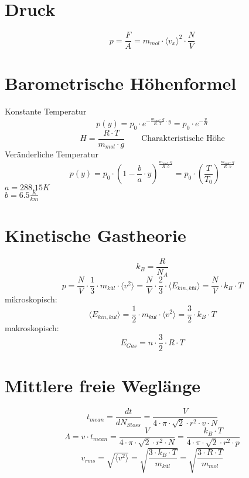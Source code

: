 \section{Druck}
\[ \boxed{p = \frac{F}{A} 
= m_{mol} \cdot {\langle v_x\rangle}^2 \cdot \frac{N}{V}} \]

\section{Barometrische Höhenformel}
Konstante Temperatur
\[ \boxed{p(y) 
= p_0 \cdot e^{- \frac{m_{mol} \cdot g}{R \cdot T} \cdot y} 
= p_0 \cdot e^{- \frac{y}{H}}}\]
\[ \boxed{H = \frac{R \cdot T}{m_{mol} \cdot g} 
\qquad \text{Charakteristische Höhe}} \]
Veränderliche Temperatur
\[ \boxed{p(y) = p_0 \cdot \left(1 - \frac{b}{a} \cdot y\right)^
{\frac{m_{mol} \cdot g}{R \cdot b}} 
= p_0 \cdot \left(\frac{T}{T_0}\right)^
{\frac{m_{mol} \cdot g}{R \cdot b}}} \]
$a = 288.15 K$ \\
$b = 6.5 \frac{K}{km}$ \\

\section{Kinetische Gastheorie}
\[ \boxed{k_B = \frac{R}{N_A}} \]
\[ \boxed{p = \frac{N}{V} \cdot \frac{1}{3} \cdot  m_{kül} \cdot \langle v^2\rangle  
= \frac{N}{V} \cdot \frac{2}{3} \cdot \langle E_{kin, kül}\rangle  
= \frac{N}{V} \cdot  k_B \cdot T} \]
mikroskopisch: 
\[ \boxed{\langle E_{kin, kül}\rangle  
= \frac{1}{2} \cdot m_{kül} \cdot  \langle v^2\rangle 
= \frac{3}{2} \cdot k_B \cdot T} \]
makroskopisch: 
\[ \boxed{E_{Gas} = n \cdot \frac{3}{2} \cdot R \cdot T} \]

\section{Mittlere freie Weglänge}
\[ \boxed{t_{mean} = \frac{d t}{d N_{Stoss}} 
= \frac{V}{4 \cdot \pi \cdot \sqrt{2} \cdot r^2 \cdot v \cdot N}} \]
\[ \boxed{\Lambda = v \cdot t_{mean} 
= \frac{V}{4 \cdot \pi \cdot \sqrt{2} \cdot r^2 \cdot N} 
= \frac{k_B \cdot T}{4 \cdot \pi \cdot \sqrt{2} \cdot r^2 \cdot p}} \]
\[ \boxed{v_{rms} = \sqrt{\langle v^2\rangle} 
= \sqrt{\frac{3 \cdot k_B \cdot T}{m_{kül}}} 
= \sqrt{\frac{3 \cdot R \cdot T}{m_{mol}}}} \]

